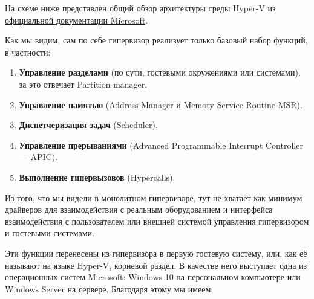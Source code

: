 \documentclass[14pt, a4paper]{article}
\begin{document}
На схеме ниже представлен общий обзор архитектуры среды Hyper-V из \href{https://docs.microsoft.com/ru-ru/virtualization/hyper-v-on-windows/reference/hyper-v-architecture}{официальной документации Microsoft}.

\begin{figure}[h]%
    \centering
    \label{framework} %
\end{figure}

Как мы видим, сам по себе гипервизор реализует только базовый набор функций, в частности:

\begin{enumerate}
    \item \textbf{Управление разделами} (по сути, гостевыми окружениями или системами), за это отвечает
    Partition manager.
    \item \textbf{Управление памятью} (Address Manager и Memory Service Routine MSR).
    \item \textbf{Диспетчеризация задач} (Scheduler).
    \item \textbf{Управление прерываниями} (Advanced Programmable Interrupt 
    Controller — APIC).
    \item \textbf{Выполнение гипервызовов} (Hypercalls).
\end{enumerate}

Из того, что мы видели в монолитном гипервизоре, тут не хватает как минимум драйверов для
взаимодействия с реальным оборудованием и интерфейса взаимодействия с пользователем или
внешней системой управления гипервизором и гостевыми системами.

Эти функции перенесены из гипервизора в первую гостевую систему, или, как её называют на языке
Hyper-V, корневой раздел. В качестве него выступает одна из операционных систем Microsoft:
Windows 10 на персональном компьютере или Windows Server на сервере. Благодаря этому мы
имеем:
\end{document}
